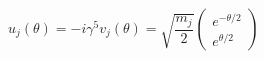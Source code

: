 \begin{equation}
u_{j}(\theta )=-i\gamma ^{5}v_{j}(\theta )=\sqrt{\frac{m_{j}}{2}}\left( 
\begin{array}{c}
e^{-\theta /2} \\ 
e^{\theta /2}%
\end{array}
\right) \mathrm{\,\,}  \label{WS}
\end{equation}

